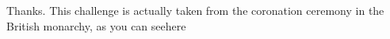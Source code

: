 Thanks. This challenge is actually taken from the coronation ceremony in the British monarchy, as you can seehere 